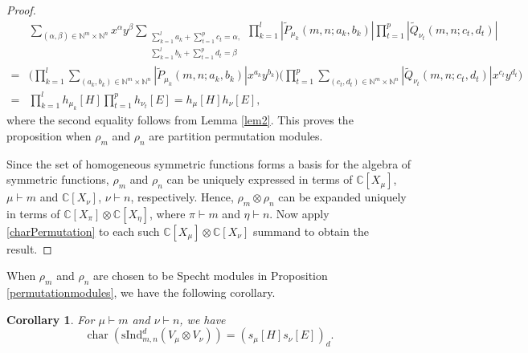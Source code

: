 \documentclass[12pt,reqno]{amsart}
\newtheorem{corollary}[theorem]{Corollary}
\theoremstyle{definition}
\theoremstyle{remark}
\newcommand{\ind}{\mathrm{sInd}_{m,n}^{d}}
\DeclareMathOperator{\ch}{char}
\begin{document}
\begin{proof}
\begin{align*}
    &\sum_{(\alpha,\beta)\in\mathbb{N}^m \times\mathbb N^n} x^{\alpha}y^{\beta}\sum_{\substack{\sum_{k=1}^{l}a_{k}+\sum_{t=1}^{p}c_{t}=\alpha,\\\sum_{k=1}^{l}b_{k}+\sum_{t=1}^{p}d_{t}=\beta}}\prod_{k=1}^{l}|\tilde{P}_{\mu_{k}}(m,n;a_k ,b_k)|\prod_{t=1}^{p}|\tilde{Q}_{\nu_{t}}(m,n;c_t ,d_t)|\\
    =& \bigg(\prod_{k=1}^{l}\sum_{(a_k, b_k)\in\mathbb{N}^m \times\mathbb N^n}|\tilde{P}_{\mu_{k}}(m,n;a_{k},b_{k})|x^{a_k}y^{b_k}\bigg)\bigg(\prod_{t=1}^{p}\sum_{(c_t, d_t)\in\mathbb{N}^m \times\mathbb N^n}|\tilde{Q}_{\nu_{t}}(m,n;c_t ,d_t)|x^{c_t}y^{d_t}\bigg)\\
    =&\prod_{k=1}^{l} h_{\mu_{k}}[H]\prod_{t=1}^{p} h_{\nu_{t}}[E] = h_{\mu}[H]h_{\nu}[E],
\end{align*}
where the second equality follows from Lemma \ref{lem2}. This proves the proposition when $\rho_m$ and $\rho_n$ are partition permutation modules.

Since the set of homogeneous symmetric functions forms a basis for the algebra of symmetric functions, $\rho_m$ and $\rho_n$ can be uniquely expressed in terms of $\mathbb{C}[X_{\mu}]$, $\mu\vdash m$ and $\mathbb{C}[X_{\nu}]$, $\nu\vdash n$, respectively. Hence, $\rho_m\otimes \rho_n$ can be expanded uniquely in terms of $\mathbb{C}[X_{\pi}]\otimes \mathbb{C}[X_{\eta}]$, where $\pi\vdash m$ and $\eta\vdash n$. Now apply \eqref{charPermutation} to each such $\mathbb{C}[X_{\mu}]\otimes \mathbb{C}[X_{\nu}]$ summand to obtain the result.
\end{proof}

When $\rho_m$ and $\rho_n$ are chosen to be Specht modules in Proposition \ref{permutationmodules}, we have the following corollary.

\begin{corollary}\label{inductionFromula}
For $\mu\vdash m$ and $\nu\vdash n$, we have
$$\ch(\ind(V_{\mu}\otimes V_{\nu}))=(s_{\mu}[H]s_{\nu}[E])_{d}.$$
\end{corollary}
\end{document}
